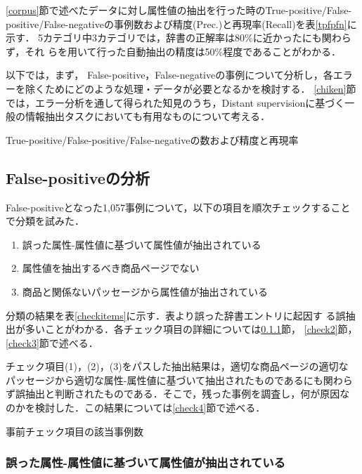 \documentclass[japanese]{jnlp_1.4}
\begin{document}
\ref{corpus}節で述べたデータに対し属性値の抽出を行った時のTrue-positive/False-positive/False-negativeの事例数および精度(Prec.)と再現率(Recall)を表\ref{tpfpfn}に示す．
5カテゴリ中3カテゴリでは，辞書の正解率は80\%に近かったにも関わらず，それ
らを用いて行った自動抽出の精度は50\%程度であることがわかる．

以下では，まず，
False-positive，False-negativeの事例について分析し，各エラーを除くためにどのような処理・データが必要となるかを検討する．
\ref{chiken}節では，エラー分析を通して得られた知見のうち，Distant supervisionに基づく一般の情報抽出タスクにおいても有用なものについて考える．

\begin{table}[b]
\caption{True-positive/False-positive/False-negativeの数および精度と再現率}
\label{tpfpfn}

\end{table}


\subsection{False-positiveの分析}

False-positiveとなった1,057事例について，以下の項目を順次チェックすることで分類を試みた．

\begin{enumerate}
\item 誤った属性-属性値に基づいて属性値が抽出されている
\item 属性値を抽出するべき商品ページでない
\item 商品と関係ないパッセージから属性値が抽出されている
\end{enumerate}

\noindent
分類の結果を表\ref{checkitems}に示す．表より誤った辞書エントリに起因す
る誤抽出が多いことがわかる．各チェック項目の詳細については\ref{check1}節，
\ref{check2}節，\ref{check3}節で述べる．

チェック項目(1)，(2)，(3)をパスした抽出結果は，適切な商品ページの適切な
パッセージから適切な属性-属性値に基づいて抽出されたものであるにも関わら
ず誤抽出と判断されたものである．そこで，残った事例を調査し，何が原因な
のかを検討した．この結果については\ref{check4}節で述べる．

\begin{table}[t]
\caption{事前チェック項目の該当事例数}
\label{checkitems}

\end{table}



\subsubsection{誤った属性-属性値に基づいて属性値が抽出されている}
\label{check1}
\end{document}
